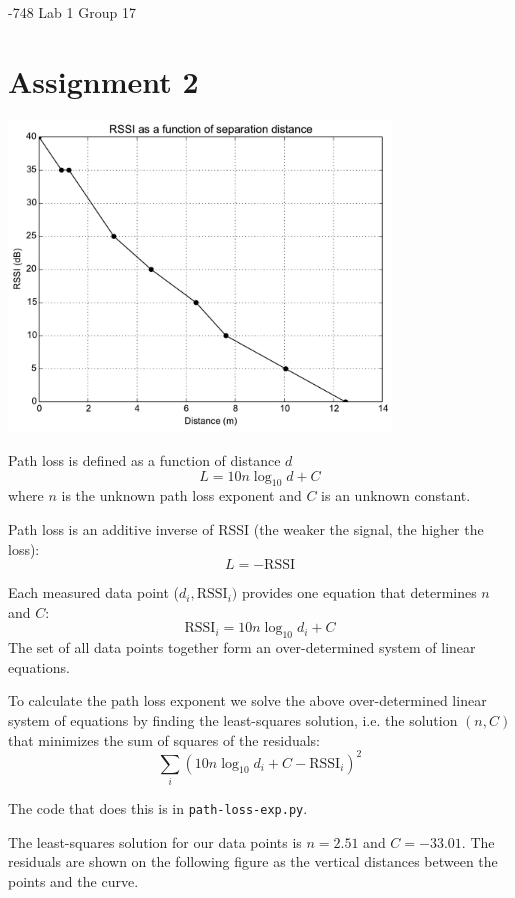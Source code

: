 \documentclass{article}
\begin{document}
-748 Lab 1 \hfill Group 17

\noindent \hrulefill

\section*{Assignment 2}

\begin{center}
\includegraphics[width=4in]{rssi-vs-dist}
\end{center}

Path loss is defined as a function of distance $d$
\[
    L = 10 n \log_{10} d + C
\]
where $n$ is the unknown path loss exponent and $C$ is an unknown constant.

Path loss is an additive inverse of RSSI (the weaker the signal, the higher the
loss):
\[
    L = -\text{RSSI}
\]

Each measured data point ($d_i, \text{RSSI}_i)$ provides one equation that
determines $n$ and $C$:
\[
    \text{RSSI}_i = 10 n \log_{10} d_i + C
\]
The set of all data points together form an over-determined system of linear
equations.

To calculate the path loss exponent we solve the above over-determined linear
system of equations by finding the least-squares solution, i.e. the solution
$(n, C)$ that minimizes the sum of squares of the residuals:
\[
\sum_i (10 n \log_{10} d_i + C - \text{RSSI}_i)^2
\]

The code that does this is in \texttt{path-loss-exp.py}.

The least-squares solution for our data points is $n = 2.51$ and $C = -33.01$.
The residuals are shown on the following figure as the vertical distances
between the points and the curve.
\end{document}
